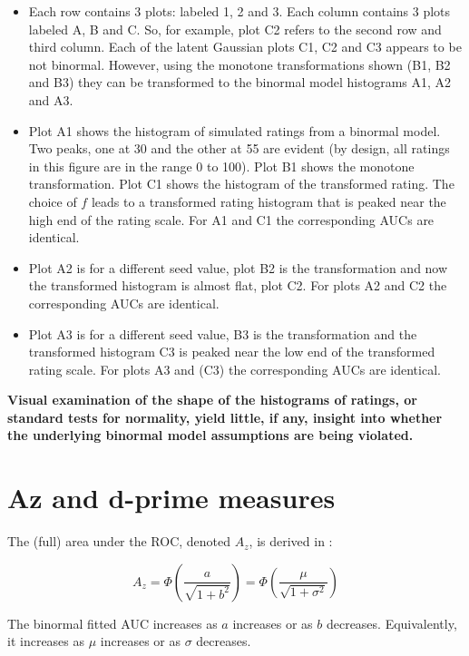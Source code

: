 \documentclass[
]{book}
\begin{document}
\begin{itemize}
\item
  Each row contains 3 plots: labeled 1, 2 and 3. Each column contains 3 plots labeled A, B and C. So, for example, plot C2 refers to the second row and third column. Each of the latent Gaussian plots C1, C2 and C3 appears to be not binormal. However, using the monotone transformations shown (B1, B2 and B3) they can be transformed to the binormal model histograms A1, A2 and A3.
\item
  Plot A1 shows the histogram of simulated ratings from a binormal model. Two peaks, one at 30 and the other at 55 are evident (by design, all ratings in this figure are in the range 0 to 100). Plot B1 shows the monotone transformation. Plot C1 shows the histogram of the transformed rating. The choice of \(f\) leads to a transformed rating histogram that is peaked near the high end of the rating scale. For A1 and C1 the corresponding AUCs are identical.
\item
  Plot A2 is for a different seed value, plot B2 is the transformation and now the transformed histogram is almost flat, plot C2. For plots A2 and C2 the corresponding AUCs are identical.
\item
  Plot A3 is for a different seed value, B3 is the transformation and the transformed histogram C3 is peaked near the low end of the transformed rating scale. For plots A3 and (C3) the corresponding AUCs are identical.
\end{itemize}

\textbf{Visual examination of the shape of the histograms of ratings, or standard tests for normality, yield little, if any, insight into whether the underlying binormal model assumptions are being violated.}

\hypertarget{binormal-model-full-auc}{%
\section{Az and d-prime measures}\label{binormal-model-full-auc}}

The (full) area under the ROC, denoted \(A_z\), is derived in \citep{thompson1989statistical}:

\begin{equation} 
A_z=\Phi\left ( \frac{a}{\sqrt{1+b^2}} \right )=\Phi\left ( \frac{\mu}{\sqrt{1+\sigma^2}} \right )
\label{eq:binormal-model-ab-2az}
\end{equation}

The binormal fitted AUC increases as \(a\) increases or as \(b\) decreases. Equivalently, it increases as \(\mu\) increases or as \(\sigma\) decreases.
\end{document}
